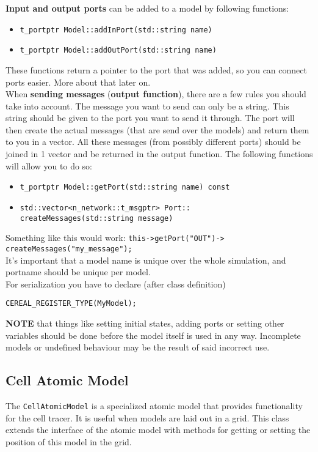 \textbf{Input and output ports} can be added to a model by following functions:
\begin{itemize}
	\item \texttt{t\_portptr Model::addInPort(std::string name)}
	\item \texttt{t\_portptr Model::addOutPort(std::string name)}
\end{itemize}
These functions return a pointer to the port that was added, so you can connect ports easier. More about that later on. \\

When \textbf{sending messages} (\textbf{output function}), there are a few rules you should take into account. The message you want to send can only be a string. This string should be given to the port you want to send it through. The port will then create the actual messages (that are send over the models) and return them to you in a vector. All these messages (from possibly different ports) should be joined in 1 vector and be returned in the output function. The following functions will allow you to do so:
\begin{itemize}
	\item \texttt{t\_portptr Model::getPort(std::string name) const}
	\item \texttt{std::vector{\textless}n\_network::t\_msgptr{\textgreater} Port:: \\createMessages(std::string message)}
\end{itemize} 
Something like this would work: \texttt{this-{\textgreater}getPort("OUT")-{\textgreater} \\createMessages("my\_message");} \\

It's important that a model name is unique over the whole simulation, and portname should be unique per model.\\

For serialization you have to declare (after class definition)
\begin{verbatim}
CEREAL_REGISTER_TYPE(MyModel);
\end{verbatim}

\textbf{NOTE} that things like setting initial states, adding ports or setting other variables should be done before the model itself is used in any way. Incomplete models or undefined behaviour may be the result of said incorrect use.

\subsection{Cell Atomic Model}
The \texttt{CellAtomicModel} is a specialized atomic model that provides functionality for the cell tracer. It is useful when models are laid out in a grid. This class extends the interface of the atomic model with methods for getting or setting the position of this model in the grid.

